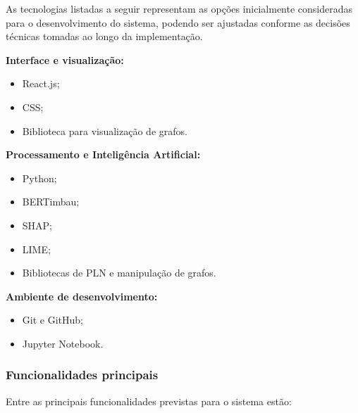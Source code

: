 \documentclass[
    12pt,                %
    openright,           %
    oneside,             %
    a4paper,             %
    english,             %
    brazil               %
]{abntex2}
\begin{document}
As tecnologias listadas a seguir representam as opções inicialmente 
consideradas para o desenvolvimento do sistema, podendo ser ajustadas 
conforme as decisões técnicas tomadas ao longo da implementação.

\textbf{Interface e visualização:}

\begin{itemize}
    \item React.js; 
    \item CSS;
    \item Biblioteca para visualização de grafos.
\end{itemize}

\textbf{Processamento e Inteligência Artificial:}

\begin{itemize}
    \item Python;
    \item BERTimbau;
    \item SHAP;
    \item LIME;
    \item Bibliotecas de PLN e manipulação de grafos.
\end{itemize}

\textbf{Ambiente de desenvolvimento:}

\begin{itemize}
    \item Git e GitHub;
    \item Jupyter Notebook.
\end{itemize}

\subsubsection{Funcionalidades principais}

Entre as principais funcionalidades previstas para o sistema estão:
%
\end{document}

